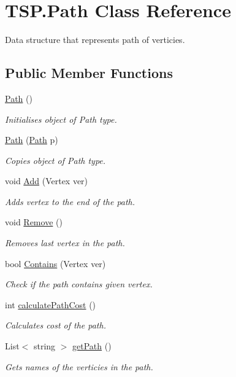 \hypertarget{class_t_s_p_1_1_path}{}\section{T\+S\+P.\+Path Class Reference}
\label{class_t_s_p_1_1_path}


Data structure that represents path of verticies.  


\subsection*{Public Member Functions}
\begin{DoxyCompactItemize}
\item 
\hyperlink{class_t_s_p_1_1_path_a7e0e3153773cfc55f12188e7391ca7e4}{Path} ()
\begin{DoxyCompactList}\small\item\em Initialises object of {\itshape Path}  type. \end{DoxyCompactList}\item 
\hyperlink{class_t_s_p_1_1_path_aca57fab7fe67faf8661ba5b5c509cd65}{Path} (\hyperlink{class_t_s_p_1_1_path}{Path} p)
\begin{DoxyCompactList}\small\item\em Copies object of {\itshape Path}  type. \end{DoxyCompactList}\item 
void \hyperlink{class_t_s_p_1_1_path_af665136228859abe5ce93796067516ee}{Add} (Vertex ver)
\begin{DoxyCompactList}\small\item\em Adds vertex to the end of the path. \end{DoxyCompactList}\item 
void \hyperlink{class_t_s_p_1_1_path_af5f4a7bbbfc9968ed2d279bbf92b6783}{Remove} ()
\begin{DoxyCompactList}\small\item\em Removes last vertex in the path. \end{DoxyCompactList}\item 
bool \hyperlink{class_t_s_p_1_1_path_a710007cd80209ca53b27e528b062812e}{Contains} (Vertex ver)
\begin{DoxyCompactList}\small\item\em Check if the path contains given vertex. \end{DoxyCompactList}\item 
int \hyperlink{class_t_s_p_1_1_path_a181ae650b5030f9149d5cd59cb144f07}{calculate\+Path\+Cost} ()
\begin{DoxyCompactList}\small\item\em Calculates cost of the path. \end{DoxyCompactList}\item 
List$<$ string $>$ \hyperlink{class_t_s_p_1_1_path_afbf4a07bd366d0254c3f6a3853556336}{get\+Path} ()
\begin{DoxyCompactList}\small\item\em Gets names of the verticies in the path. \end{DoxyCompactList}\end{DoxyCompactItemize}

